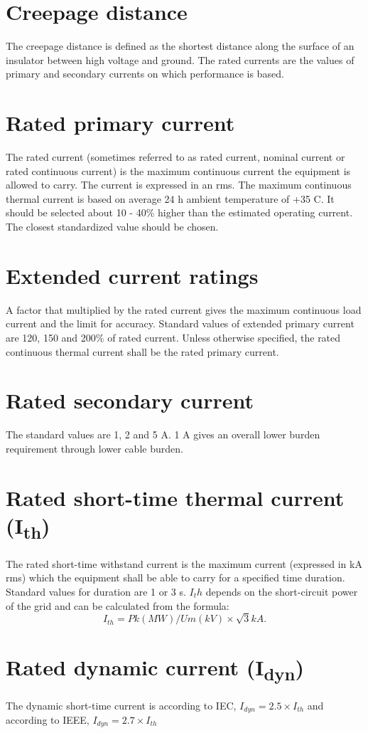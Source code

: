 \section*{Creepage distance}
The creepage distance is defined as the shortest distance along the surface of an insulator between high voltage and ground. The rated currents are the values of primary and secondary currents on which performance is based. 

\section*{Rated primary current}
The rated current (sometimes referred to as rated current, nominal current or rated continuous current) is the maximum continuous current the equipment is allowed to carry. The current is expressed in an rms. The maximum continuous thermal current is based on average 24 h ambient temperature of +35 \textdegree C. It should be selected about 10 - 40\% higher than the estimated operating current. The closest standardized value should be chosen.

\section*{Extended current ratings}
A factor that multiplied by the rated current gives the maximum continuous load current and the limit for accuracy. Standard values of extended primary current are 120, 150 and 200\% of rated current. Unless otherwise specified, the rated continuous thermal current shall be the rated primary current.
\section*{Rated secondary current}
The standard values are 1, 2 and 5 A. 1 A gives an overall lower burden requirement through lower cable burden.
\section*{Rated short-time thermal current (I\textsubscript{th})}
The rated short-time withstand current is the maximum current (expressed in kA rms) which the equipment shall be able to carry for a specified time duration. Standard values for duration are 1 or 3 s. $I_th$ depends on the short-circuit power of the grid and can be calculated from the formula:
\[
I_{th} = Pk (MW) / Um (kV) \times \sqrt{3} kA.
\]
\section*{Rated dynamic current (I\textsubscript{dyn})}
The dynamic short-time current is according to IEC, $I_{dyn} = 2.5 \times I_{th}$ and according to IEEE, $I_{dyn} = 2.7 \times I_{th}$

